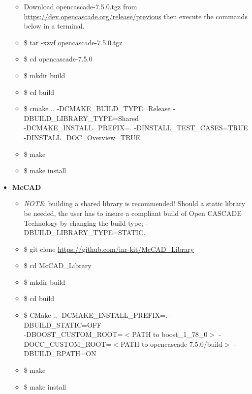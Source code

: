 \documentclass[letterpaper, 10 pt]{report}
\begin{document}
\begin{itemize}
\begin{itemize}
    	\item Download opencascade-7.5.0.tgz from \url{https://dev.opencascade.org/release/previous} then execute the commands below in a terminal.
    	\item \$ tar -xzvf opencascade-7.5.0.tgz
    	\item \$ cd opencascade-7.5.0
    	\item \$ mkdir build
    	\item \$ cd build
    	\item \$ cmake .. -DCMAKE\_BUILD\_TYPE=Release -DBUILD\_LIBRARY\_TYPE=Shared \\ -DCMAKE\_INSTALL\_PREFIX=. -DINSTALL\_TEST\_CASES=TRUE \\ -DINSTALL\_DOC\_Overview=TRUE
    	\item \$ make
    	\item \$ make install
    \end{itemize}
	\item \textbf{McCAD}
	\begin{itemize}
		\item \emph{NOTE}: building a shared library is recommended! Should a static library be needed, the user has to insure a compliant build of Open CASCADE Technology by changing the build type; -DBUILD\_LIBRARY\_TYPE=STATIC.
		\item \$ git clone \url{https://github.com/inr-kit/McCAD_Library}
		\item \$ cd McCAD\_Library
		\item \$ mkdir build
		\item \$ cd build
		\item \$ CMake .. -DCMAKE\_INSTALL\_PREFIX=. -DBUILD\_STATIC=OFF \\ -DBOOST\_CUSTOM\_ROOT=$<$PATH to boost\_1\_78\_0$>$ -DOCC\_CUSTOM\_ROOT=$<$PATH to opencascade-7.5.0/build$>$ -DBUILD\_RPATH=ON
		\item \$ make
		\item \$ make install
	\end{itemize}
  \end{itemize}
\end{document}
